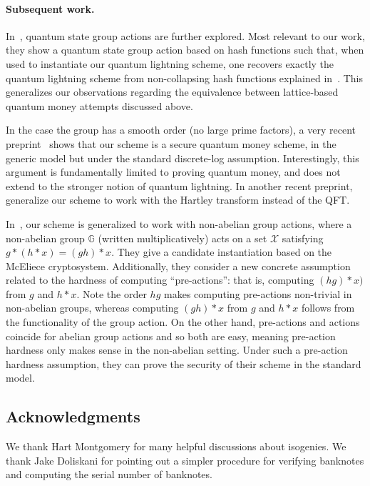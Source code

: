 \documentclass{article}\usepackage[a4paper,margin=20mm]{geometry}
\numberwithin{theorem}{section}
\numberwithin{equation}{section}
\newcommand{\G}{\mathbb{G}}
\newcommand{\Xs}{{\mathcal{X}}}
\begin{document}
\paragraph{Subsequent work.} In~\cite{C:MutZha25}, quantum state group actions are further explored. Most relevant to our work, they show a quantum state group action based on hash functions such that, when used to instantiate our quantum lightning scheme, one recovers exactly the quantum lightning scheme from non-collapsing hash functions explained in~\cite{DBLP:journals/joc/Zhandry21}. This generalizes our observations regarding the equivalence between lattice-based quantum money attempts discussed above.

In the case the group has a smooth order (no large prime factors), a very recent preprint~\cite{EPRINT:Doliskani25} shows that our scheme is a secure quantum money scheme, in the generic model but under the standard discrete-log assumption. Interestingly, this argument is fundamentally limited to proving quantum money, and does not extend to the stronger notion of quantum lightning. In another recent preprint,~\cite{DolMirMou25} generalize our scheme to work with the Hartley transform instead of the QFT.

In~\cite{STOC:BosNehZha25}, our scheme is generalized to work with non-abelian group actions, where a non-abelian group $\G$ (written multiplicatively) acts on a set $\Xs$ satisfying $g*(h*x)=(gh)*x$. They give a candidate instantiation based on the McEliece cryptosystem. Additionally, they consider a new concrete assumption related to the hardness of computing ``pre-actions'': that is, computing $(hg)*x)$ from $g$ and $h*x$. Note the order $hg$ makes computing pre-actions non-trivial in non-abelian groups, whereas computing $(gh)*x$ from $g$ and $h*x$ follows from the functionality of the group action. On the other hand, pre-actions and actions coincide for abelian group actions and so both are easy, meaning pre-action hardness only makes sense in the non-abelian setting. Under such a pre-action hardness assumption, they can prove the security of their scheme in the standard model.



\subsection*{Acknowledgments} We thank Hart Montgomery for many helpful discussions about isogenies. We thank Jake Doliskani for pointing out a simpler procedure for verifying banknotes and computing the serial number of banknotes.
\end{document}
